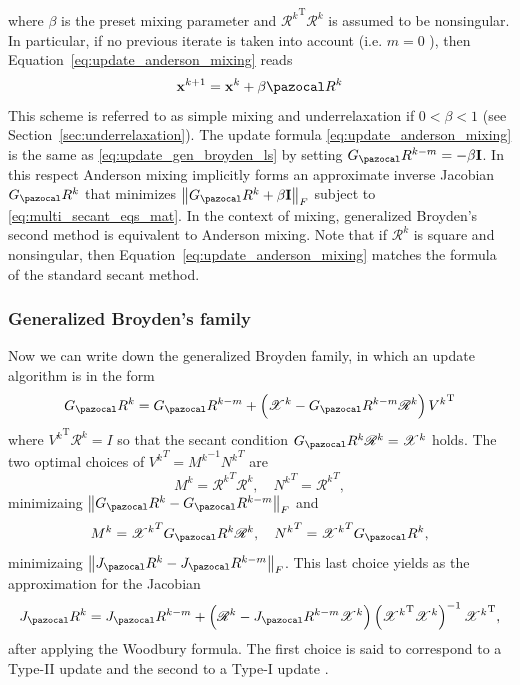 where \(\beta\) is the preset mixing parameter and \({\mathscr{R}^{k}}^{\mathrm{T}} \mathscr{R}^{k}\) is assumed to be nonsingular.
In particular, if no previous iterate is taken into account (i.e. \(m=0\) ), then Equation~\eqref{eq:update_anderson_mixing} reads
\begin{equation}
  \mathbf x^{k+1}=\mathbf x^{k}+\beta \pazocal R^{k}
\end{equation}
This scheme is referred to as simple mixing and underrelaxation if \(0<\beta<1\) (see Section~\ref{sec:underrelaxation}).
The update formula \eqref{eq:update_anderson_mixing} is the same as \eqref{eq:update_gen_broyden_ls} by setting \(G_\pazocal R^{k-m}=-\beta \mathbf I\).
In this respect Anderson mixing implicitly forms an approximate inverse Jacobian \(G_\pazocal R^{k}\) that minimizes \(\left\|G_\pazocal R^{k}+\beta \mathbf I\right\|_{F}\) subject to \eqref{eq:multi_secant_eqs_mat}.
In the context of mixing, generalized Broyden's second method is equivalent to Anderson mixing.
Note that if \(\mathscr{R}^{k}\) is square and nonsingular, then Equation~\eqref{eq:update_anderson_mixing} matches the formula of the standard secant method.

\subsubsection{Generalized Broyden's family} \label{sec:gen_broyden_fam}

Now we can write down the generalized Broyden family, in which an update algorithm is in the form
\begin{equation} \label{eq:inv_jacob_gen_broyden}
G_\pazocal R^{k}=G_\pazocal R^{k-m}+\left(\mathscr{X}^{k}-G_\pazocal R^{k-m} \mathscr{R}^{k}\right) {V^{k}}^{\mathrm{T}}
\end{equation}
where \({V^{k}}^{\mathrm{T}} \mathscr{R}^{k}=I\) so that the secant condition \(G_\pazocal R^{k} \mathscr{R}^{k}=\mathscr{X}^{k}\) holds.
The two optimal choices of \({V^k}^T = {M^k}^{-1}{N^k}^T\) are
\begin{equation} \label{eq:broyden_type_ii}
  {M^k} = {\mathscr R^k}^T \mathscr R^k,\quad {N^k}^T = {\mathscr R^k}^T,
\end{equation}
minimizaing \(\left\|G_\pazocal R^k - G_\pazocal R^{k-m}\right\|_F\) and
\begin{equation} \label{eq:broyden_type_i}
  {M^k} = {\mathscr X^k}^T G_\pazocal R^k \mathscr R^k,\quad {N^k}^T = {\mathscr X^k}^T G_\pazocal R^k,
\end{equation}
minimizaing \(\left\|J_\pazocal R^k - J_\pazocal R^{k-m}\right\|_F\).
This last choice yields as the approximation for the Jacobian
\begin{equation}
  J_\pazocal R^{k}=J_\pazocal R^{k-m}+\left(\mathscr{R}^{k}-J_\pazocal R^{k-m} \mathscr{X}^{k}\right)\left({\mathscr{X}^{k}}^{\mathrm{T}} \mathscr{X}^{k}\right)^{-1} {\mathscr{X}^{k}}^{\mathrm{T}},
\end{equation}
after applying the Woodbury formula.
The first choice is said to correspond to a Type-II update and the second to a Type-I update \citep{fang_two_2009}.


